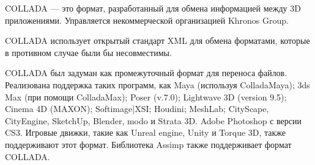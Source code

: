 COLLADA — это формат, разработанный для обмена  информацией между 3D приложениями.
Управляется некоммерческой организацией Khronos Group.

\medskip
COLLADA использует открытый стандарт XML для обмена форматами, которые в противном случае были бы несовместимы.

\medskip
COLLADA был задуман как промежуточный формат для переноса файлов.
Реализована поддержка таких программ, как Maya (используя ColladaMaya); 3ds Max (при помощи ColladaMax); Poser (v.7.0); Lightwave 3D (version 9.5); Cinema 4D (MAXON); Softimage|XSI; Houdini; MeshLab; CityScape, CityEngine, SketchUp, Blender, modo и Strata 3D.
Adobe Photoshop с версии CS3.
Игровые движки, такие как Unreal engine, Unity и Torque 3D, также поддерживают этот формат.
Библиотека Assimp также поддерживает формат COLLADA.
